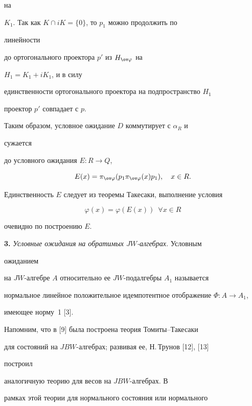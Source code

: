 \begin{pf}
на 


$K_1$. Так как $K\cap i{}K=\{0\}$, то $p_1$ можно продолжить по 


линейности 


до ортогонального проектора $p'$ из $H_{\ov\varphi}$ на 


$H_1=K_1+i{}K_1$, и в силу 


единственности ортогонального проектора на подпространство $H_1$ 


проектор $p'$ совпадает с $p$. 


 


Таким образом, условное ожидание $D$ коммутирует с $\alpha_R$ и 


сужается 


до условного ожидания $E:R\to Q$,


$$ 


E(x)=\pi_{\ov\varphi}(p_1\pi_{\ov\varphi}(x)p_1),\quad x\in R. 


$$ 


Единственность $E$ следует из теоремы Такесаки, выполнение условия 


$$ 


\varphi(x)=\varphi(E(x))\ \; \forall x\in R 


$$ 


очевидно по построению $E$. 


\end{pf} 


 


{\bf 3.} {\it Условные ожидания на обратимых $JW$-алгебрах.} Условным 


ожиданием 


на $JW$-алгебре $A$ относительно ее $JW$-подалгебры $A_1$ называется 


нормальное линейное положительное идемпотентное отображение $\Phi:A\to 


A_1$, 


имеющее норму~1 [3]. 


 


Напомним, что в [9] была построена теория Томиты--Такесаки 


для состояний на $JBW$-алгебрах; развивая ее, Н.\,Трунов [12], [13] 


построил 


аналогичную теорию для весов на $JBW$-алгебрах. В 


рамках этой теории для нормального состояния или нормального 


